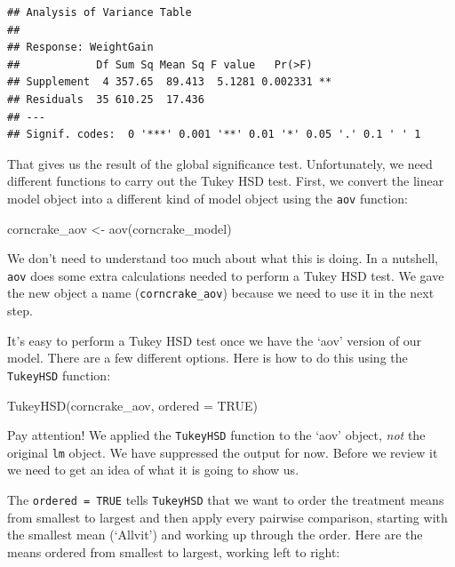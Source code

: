 \documentclass[
]{book}
\newenvironment{Shaded}{\begin{snugshade}}{\end{snugshade}}
\newcommand{\AttributeTok}[1]{\textcolor[rgb]{0.77,0.63,0.00}{#1}}
\newcommand{\ConstantTok}[1]{\textcolor[rgb]{0.00,0.00,0.00}{#1}}
\newcommand{\FunctionTok}[1]{\textcolor[rgb]{0.00,0.00,0.00}{#1}}
\newcommand{\NormalTok}[1]{#1}
\newcommand{\OtherTok}[1]{\textcolor[rgb]{0.56,0.35,0.01}{#1}}
\begin{document}
\begin{verbatim}
## Analysis of Variance Table
## 
## Response: WeightGain
##            Df Sum Sq Mean Sq F value   Pr(>F)   
## Supplement  4 357.65  89.413  5.1281 0.002331 **
## Residuals  35 610.25  17.436                    
## ---
## Signif. codes:  0 '***' 0.001 '**' 0.01 '*' 0.05 '.' 0.1 ' ' 1
\end{verbatim}

That gives us the result of the global significance test. Unfortunately, we need different functions to carry out the Tukey HSD test. First, we convert the linear model object into a different kind of model object using the \texttt{aov} function:

\begin{Shaded}
\begin{Highlighting}[]
\NormalTok{corncrake\_aov }\OtherTok{\textless{}{-}} \FunctionTok{aov}\NormalTok{(corncrake\_model)}
\end{Highlighting}
\end{Shaded}

We don't need to understand too much about what this is doing. In a nutshell, \texttt{aov} does some extra calculations needed to perform a Tukey HSD test. We gave the new object a name (\texttt{corncrake\_aov}) because we need to use it in the next step.

It's easy to perform a Tukey HSD test once we have the `aov' version of our model. There are a few different options. Here is how to do this using the \texttt{TukeyHSD} function:

\begin{Shaded}
\begin{Highlighting}[]
\FunctionTok{TukeyHSD}\NormalTok{(corncrake\_aov, }\AttributeTok{ordered =} \ConstantTok{TRUE}\NormalTok{)}
\end{Highlighting}
\end{Shaded}

Pay attention! We applied the \texttt{TukeyHSD} function to the `aov' object, \emph{not} the original \texttt{lm} object. We have suppressed the output for now. Before we review it we need to get an idea of what it is going to show us.

The \texttt{ordered\ =\ TRUE} tells \texttt{TukeyHSD} that we want to order the treatment means from smallest to largest and then apply every pairwise comparison, starting with the smallest mean (`Allvit') and working up through the order. Here are the means ordered from smallest to largest, working left to right:
\end{document}
